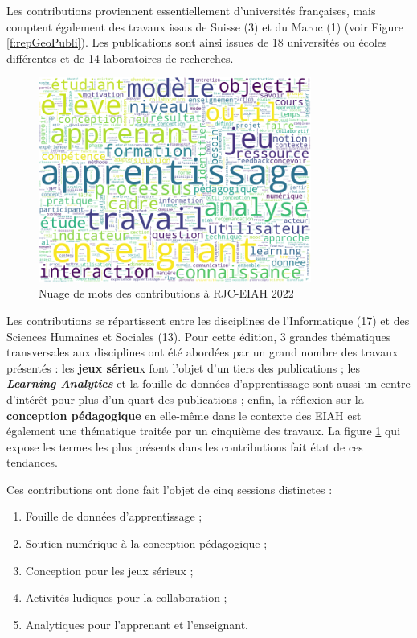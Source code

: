 Les contributions proviennent essentiellement d’universités françaises, mais comptent également des travaux issus de Suisse (3) et du Maroc (1) (voir Figure \ref{f:repGeoPubli}). 
Les publications sont ainsi issues de 18 universités ou écoles différentes et de 14 laboratoires de recherches.

\begin{figure}[ht]
	\centering
	\includegraphics[width=0.8\textwidth]{Content/figures/wordcloud.png}
	\caption{Nuage de mots des contributions à RJC-EIAH 2022}
	\label{f:wordCloud}
\end{figure}

Les contributions se répartissent entre les disciplines de l’Informatique (17) et des Sciences Humaines et Sociales (13). 
Pour cette édition, 3 grandes thématiques transversales aux disciplines ont été abordées par un grand nombre des travaux présentés : les \textbf{jeux sérieu}x font l’objet d’un tiers des publications ; les \textbf{\textit{Learning Analytics}} et la fouille de données d’apprentissage sont aussi un centre d’intérêt pour plus d’un quart des publications ; enfin, la réflexion sur la \textbf{conception pédagogique} en elle-même dans le contexte des EIAH est également une thématique traitée par un cinquième des travaux. 
La figure \ref{f:wordCloud} qui expose les termes les plus présents dans les contributions fait état de ces tendances.

Ces contributions ont donc fait l’objet de cinq sessions distinctes : 
\begin{enumerate}
	\item Fouille de données d’apprentissage ;
	\item Soutien numérique à la conception pédagogique ;
	\item Conception pour les jeux sérieux ;
	\item Activités ludiques pour la collaboration ;
	\item Analytiques pour l’apprenant et l’enseignant.
\end{enumerate}

